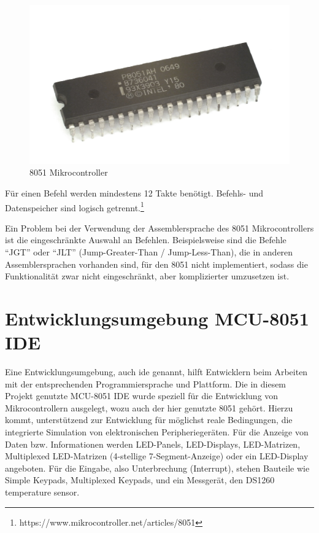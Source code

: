 \documentclass[11pt,ngerman]{report}
\begin{document}
\begin{figure}[h]
	\caption{8051 Mikrocontroller}
	\centering
	\includegraphics[width=\textwidth]{Prozessor.jpg}
\end{figure}

Für einen Befehl werden mindestens 12 Takte benötigt. Befehls- und Datenspeicher sind logisch getrennt.\footnote{https://www.mikrocontroller.net/articles/8051}

Ein Problem bei der Verwendung der Assemblersprache des 8051 Mikrocontrollers ist die eingeschränkte Auswahl an Befehlen. Beispielsweise sind die Befehle “JGT” oder “JLT” (Jump-Greater-Than / Jump-Less-Than), die in anderen Assemblersprachen vorhanden sind, für den 8051 nicht implementiert, sodass die Funktionalität zwar nicht eingeschränkt, aber komplizierter umzusetzen ist.

\section{Entwicklungsumgebung MCU-8051 IDE}

Eine Entwicklungsumgebung, auch \ac{ide} genannt, hilft Entwicklern beim Arbeiten mit der entsprechenden Programmiersprache und Plattform. Die in diesem Projekt genutzte MCU-8051 IDE wurde speziell für die Entwicklung von Mikrocontrollern ausgelegt, wozu auch der hier genutzte 8051 gehört. Hierzu kommt, unterstützend zur Entwicklung für möglichst reale Bedingungen, die integrierte Simulation von elektronischen Peripheriegeräten. Für die Anzeige von Daten bzw. Informationen werden LED-Panels, LED-Displays, LED-Matrizen, Multiplexed LED-Matrizen (4-stellige 7-Segment-Anzeige) oder ein LED-Display angeboten. Für die Eingabe, also Unterbrechung (Interrupt), stehen Bauteile wie Simple Keypads, Multiplexed Keypads, und ein Messgerät, den DS1260 temperature sensor. 
\end{document}
